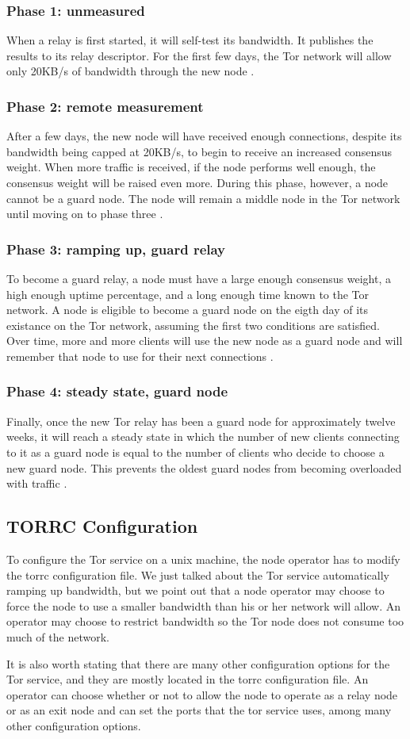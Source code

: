 \documentclass[12pt,journal]{IEEEtran}
\begin{document}
\subsubsection{Phase 1: unmeasured}
When a relay is first started, it will self-test its bandwidth. It publishes the results to its relay descriptor. For the first few days, the Tor network will allow only 20KB/s of bandwidth through the new node \cite{arma2013}.
\subsubsection{Phase 2: remote measurement}
After a few days, the new node will have received enough connections, despite its bandwidth being capped at 20KB/s, to begin to receive an increased consensus weight. When more traffic is received, if the node performs well enough, the consensus weight will be raised even more. During this phase, however, a node cannot be a guard node. The node will remain a middle node in the Tor network until moving on to phase three \cite{arma2013}.
\subsubsection{Phase 3: ramping up, guard relay}
To become a guard relay, a node must have a large enough consensus weight, a high enough uptime percentage, and a long enough time known to the Tor network. A node is eligible to become a guard node on the eigth day of its existance on the Tor network, assuming the first two conditions are satisfied. Over time, more and more clients will use the new node as a guard node and will remember that node to use for their next connections \cite{arma2013}.
\subsubsection{Phase 4: steady state, guard node}
Finally, once the new Tor relay has been a guard node for approximately twelve weeks, it will reach a steady state in which the number of new clients connecting to it as a guard node is equal to the number of clients who decide to choose a new guard node. This prevents the oldest guard nodes from becoming overloaded with traffic \cite{arma2013}.
\subsection{TORRC Configuration}
To configure the Tor service on a unix machine, the node operator has to modify the torrc configuration file. We just talked about the Tor service automatically ramping up bandwidth, but we point out that a node operator may choose to force the node to use a smaller bandwidth than his or her network will allow. An operator may choose to restrict bandwidth so the Tor node does not consume too much of the network.
\par
It is also worth stating that there are many other configuration options for the Tor service, and they are mostly located in the torrc configuration file. An operator can choose whether or not to allow the node to operate as a relay node or as an exit node and can set the ports that the tor service uses, among many other configuration options.
\end{document}
